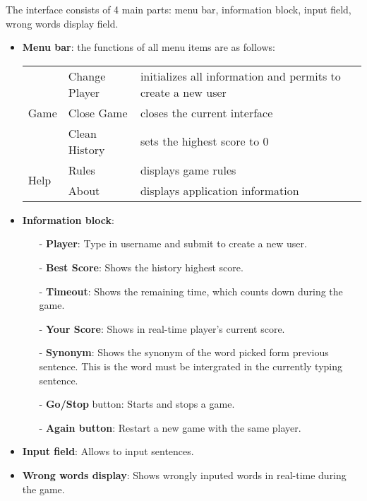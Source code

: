\documentclass{article}
\begin{document}
The interface consists of 4 main parts: menu bar, information block, input field, wrong words display field.
\begin{itemize}
	\item \textbf{Menu bar}: the functions of all menu items are as follows: \\
	\begin{tabular}{l|l|l}
		\hline
		\hline
		\multirow{3}{*}{Game} & Change Player & initializes all information and permits to create a new user \\
		\cline{2-3}
		& Close Game & closes the current interface \\
		\cline{2-3}
		& Clean History & sets the highest score to 0 \\
		\hline
		\multirow{2}{*}{Help} & Rules & displays game rules \\
		\cline{2-3}
		& About & displays application information \\
		\hline
		\hline
	\end{tabular}

	\item \textbf{Information block}: 
		\begin{itemize}
			\item[-] \textbf{Player}: Type in username and submit to create a new user.
			\item[-] \textbf{Best Score}: Shows the history highest score.
			\item[-] \textbf{Timeout}: Shows the remaining time, which counts down during the game.
			\item[-] \textbf{Your Score}: Shows in real-time player's current score.
			\item[-] \textbf{Synonym}: Shows the synonym of the word picked form previous sentence. This is the word must be intergrated in the currently typing sentence.
			\item[-] \textbf{Go/Stop} button: Starts and stops a game.
			\item[-] \textbf{Again button}: Restart a new game with the same player.
		\end{itemize}
	\item \textbf{Input field}: Allows to input sentences.
	\item \textbf{Wrong words display}: Shows wrongly inputed words in real-time during the game.
\end{itemize}

\end{document}
